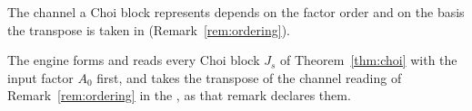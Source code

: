 
The channel a Choi block represents depends on the factor order and on the
basis the transpose is taken in (Remark~\ref{rem:ordering}).

\begin{requirement}\label{req:choi-convention}
The engine forms and reads every Choi block $J_s$ of Theorem~\ref{thm:choi}
with the input factor $A_0$ first, and takes the transpose of the channel
reading of Remark~\ref{rem:ordering} in the
, as that remark declares them.
\end{requirement}
